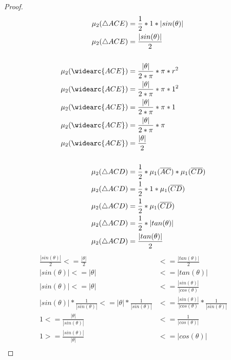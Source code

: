\documentclass{article}
\theoremstyle{definition}
\begin{document}
\begin{proof}
\begin{align*}
		\mu_2(\bigtriangleup ACE) &= \frac{1}{2} * 1 * |sin(\theta)|\\		
		\mu_2(\bigtriangleup ACE) &= \frac{|sin(\theta)|}{2}\\
		\\
		\mu_2(\widearc {ACE}) &= \frac{|\theta|}{2*\pi} * \pi * r^2\\
		\mu_2(\widearc {ACE}) &= \frac{|\theta|}{2*\pi} * \pi * 1^2\\		
		\mu_2(\widearc {ACE}) &= \frac{|\theta|}{2*\pi} * \pi * 1\\		
		\mu_2(\widearc {ACE}) &= \frac{|\theta|}{2*\pi} * \pi\\		
		\mu_2(\widearc {ACE}) &= \frac{|\theta|}{2}\\		
		\\
		\mu_2( \bigtriangleup ACD) &= \frac{1}{2} * \mu_1(\overline{AC}) * \mu_1(\overline{CD})\\
		\mu_2( \bigtriangleup ACD) &= \frac{1}{2} * 1 * \mu_1(\overline{CD})\\		
		\mu_2( \bigtriangleup ACD) &= \frac{1}{2} * \mu_1(\overline{CD})\\		
		\mu_2( \bigtriangleup ACD) &= \frac{1}{2} * |tan(\theta)|\\				
		\mu_2( \bigtriangleup ACD) &= \frac{|tan(\theta)|}{2}\\		
	\end{align*}
	\begin{align*}
		\frac{|sin(\theta)|}{2} <=  \frac{|\theta|}{2} &<=  \frac{|tan(\theta)|}{2}\\
		|sin(\theta)| <=  |\theta| &<=  |tan(\theta)|\\		
		|sin(\theta)| <=  |\theta| &<=  \frac{|sin(\theta)|}{|cos(\theta)}\\				
		|sin(\theta)|*\frac{1}{|sin(\theta)|} <=  |\theta|*\frac{1}{|sin(\theta)|} &<=  \frac{|sin(\theta)|}{|cos(\theta)}*\frac{1}{|sin(\theta)|}\\		
		1 <=  \frac{|\theta|}{|sin(\theta)|} &<=  \frac{1}{|cos(\theta)|}\\
		1 >=  \frac{|sin(\theta)|}{|\theta|} &<= |cos(\theta)|\\
	\end{align*}

\end{proof}
\end{document}

